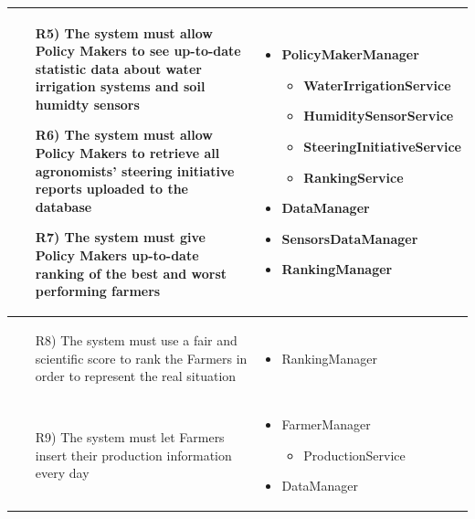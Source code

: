 \documentclass[table, 12pt]{article}
\begin{document}
\begin{longtable}{|p{}|p{}|}
    \begin{itemize}
        \item[R5)] The system must allow Policy Makers to see up-to-date statistic data about water irrigation systems and soil humidty sensors
        \item[R6)] The system must allow Policy Makers to retrieve all agronomists' steering initiative reports uploaded to the database
        \item[R7)] The system must give Policy Makers up-to-date ranking of the best and worst performing farmers  
    \end{itemize}
    & 
    \begin{itemize}
        \item PolicyMakerManager
        \begin{itemize}
            \item WaterIrrigationService
            \item HumiditySensorService
            \item SteeringInitiativeService
            \item RankingService
        \end{itemize}
        \item DataManager
        \item SensorsDataManager
        \item RankingManager
    \end{itemize}
    \\\hline

    \begin{itemize}
        \item[R8)] The system must use a fair and scientific score to rank the Farmers in order to represent the real situation 
    \end{itemize}
    & 
    \begin{itemize}
        \item RankingManager
    \end{itemize}
    \\\hline

    \begin{itemize}
        \item[R9)] The system must let Farmers insert their production information every day 
    \end{itemize}
    &
    \begin{itemize}
        \item FarmerManager
        \begin{itemize}
            \item ProductionService
        \end{itemize}
        \item DataManager
    \end{itemize}
    \\\hline


\end{longtable}
\end{document}
